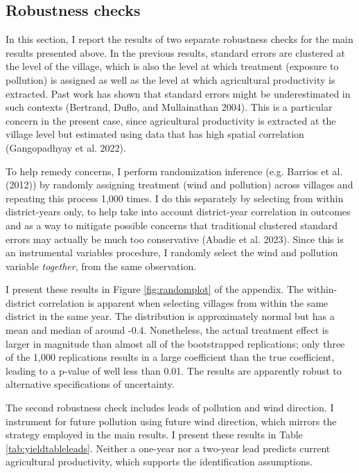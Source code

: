 \documentclass[
]{article}
\begin{document}
\hypertarget{robustness-checks}{%
\subsection{Robustness checks}\label{robustness-checks}}

In this section, I report the results of two separate robustness checks for the main results presented above. In the previous results, standard errors are clustered at the level of the village, which is also the level at which treatment (exposure to pollution) is assigned as well as the level at which agricultural productivity is extracted. Past work has shown that standard errors might be underestimated in such contexts (Bertrand, Duflo, and Mullainathan 2004). This is a particular concern in the present case, since agricultural productivity is extracted at the village level but estimated using data that has high spatial correlation (Gangopadhyay et al. 2022).

To help remedy concerns, I perform randomization inference (e.g. Barrios et al. (2012)) by randomly assigning treatment (wind and pollution) across villages and repeating this process 1,000 times. I do this separately by selecting from within district-years only, to help take into account district-year correlation in outcomes and as a way to mitigate possible concerns that traditional clustered standard errors may actually be much too conservative (Abadie et al. 2023). Since this is an instrumental variables procedure, I randomly select the wind and pollution variable \emph{together}, from the same observation.

I present these results in Figure \ref{fig:randomplot} of the appendix. The within-district correlation is apparent when selecting villages from within the same district in the same year. The distribution is approximately normal but has a mean and median of around -0.4. Nonetheless, the actual treatment effect is larger in magnitude than almost all of the bootstrapped replications; only three of the 1,000 replications results in a large coefficient than the true coefficient, leading to a p-value of well less than 0.01. The results are apparently robust to alternative specifications of uncertainty.

The second robustness check includes leads of pollution and wind direction. I instrument for future pollution using future wind direction, which mirrors the strategy employed in the main results. I present these results in Table \ref{tab:yieldtableleads}. Neither a one-year nor a two-year lead predicts current agricultural productivity, which supports the identification assumptions.
\end{document}
